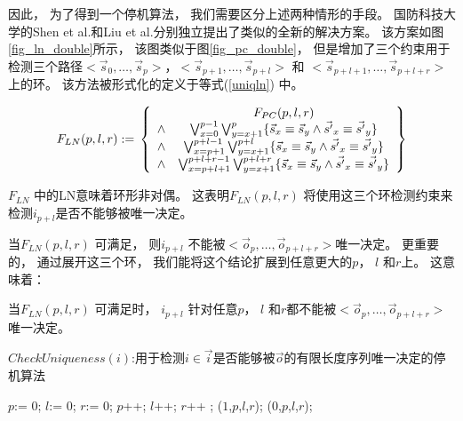 因此，
为了得到一个停机算法，
我们需要区分上述两种情形的手段。
国防科技大学的Shen et al.和Liu et al.分别独立提出了类似的全新的解决方案。
该方案如图\ref{fig_ln_double}所示，
该图类似于图\ref{fig_pc_double}，
但是增加了三个约束用于检测三个路径$<\vec{s}_{0},\dots,\vec{s}_{p}>$，$<\vec{s}_{p+1},\dots,\vec{s}_{p+l}>$ 和
$<\vec{s}_{p+l+1},\dots,\vec{s}_{p+l+r}>$上的环。
该方法被形式化的定义于等式(\ref{uniqln}) 中。

\begin{equation}\label{uniqln}
F_{LN}(p,l,r):=\\
\left\{
\begin{array}{cc}
&F_{PC}(p,l,r)\\
\wedge&\bigvee_{x=0}^{p-1}\bigvee_{y=x+1}^{p} \{\vec{s}_x\equiv \vec{s}_y\wedge \vec{s'}_x\equiv \vec{s'}_y\} \\
\wedge&\bigvee_{x=p+1}^{p+l-1}\bigvee_{y=x+1}^{p+l} \{\vec{s}_x\equiv \vec{s}_y\wedge \vec{s'}_x\equiv \vec{s'}_y\} \\
\wedge&\bigvee_{x=p+l+1}^{p+l+r-1}\bigvee_{y=x+1}^{p+l+r} \{\vec{s}_x\equiv \vec{s}_y\wedge \vec{s'}_x\equiv \vec{s'}_y\}
\end{array}
\right\}
\end{equation}

$F_{LN}$ 中的LN意味着环形非对偶。
这表明$F_{LN}(p,l,r)$ 将使用这三个环检测约束来检测$i_{p+l}$是否不能够被唯一决定。

当$F_{LN}(p,l,r)$ 可满足，
则$i_{p+l}$ 不能被$<\vec{o}_{p},\dots,\vec{o}_{p+l+r}>$唯一决定。
更重要的，
通过展开这三个环，
我们能将这个结论扩展到任意更大的$p$， $l$ 和$r$上。
这意味着：

\begin{proposition}\label{prop_ln1}
当$F_{LN}(p,l,r)$ 可满足时，
$i_{p+l}$ 针对任意$p$， $l$ 和$r$都不能被$<\vec{o}_{p},\dots,\vec{o}_{p+l+r}>$ 唯一决定。
\end{proposition}



\begin{algorithm}[t]
\caption{$CheckUniqueness(i)$:用于检测$i\in\vec{i}$是否能够被$\vec{o}$的有限长度序列唯一决定的停机算法}
\label{alg_pcln_chap1}
\begin{algorithmic}[1]
\STATE $p$:= 0;
\STATE $l$:= 0;
\STATE $r$:= 0;
\STATE $p$++;
\STATE $l$++;
\STATE $r$++ ;
\label{linepc1}
\RETURN ($1$,$p$,$l$,$r$)\label{lineln1};
\label{lnsat}
\RETURN ($0$,$p$,$l$,$r$);
\ENDIF
\ENDWHILE
\end{algorithmic}
\end{algorithm}

